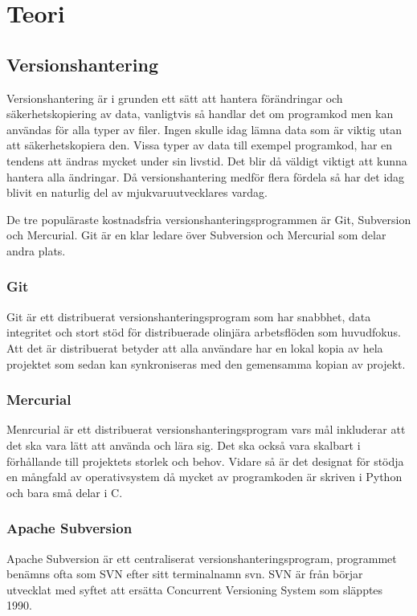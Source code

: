 \section{Teori}
\subsection{Versionshantering}
Versionshantering är i grunden ett sätt att hantera förändringar och säkerhetskopiering av data, vanligtvis så handlar det om programkod men kan användas för alla typer av filer. Ingen skulle idag lämna data som är viktig utan att säkerhetskopiera den. Vissa typer av data till exempel programkod, har en tendens att ändras mycket under sin livstid. Det blir då väldigt viktigt att kunna hantera alla ändringar. Då versionshantering medför flera fördela så har det idag blivit en naturlig del av mjukvaruutvecklares vardag.\cite{VersionControlGit}

De tre populäraste kostnadsfria versionshanteringsprogrammen är Git, Subversion och Mercurial. Git är en klar ledare över Subversion och Mercurial som delar andra plats.\cite{version_comp}
\subsubsection{Git}
Git är ett distribuerat versionshanteringsprogram som har snabbhet, data integritet och stort stöd för distribuerade olinjära arbetsflöden som huvudfokus. Att det är distribuerat betyder att alla användare har en lokal kopia av hela projektet som sedan kan synkroniseras med den gemensamma kopian av projekt.\cite{VersionControlGit}\cite{web_Git}

\subsubsection{Mercurial}
Menrcurial är ett distribuerat versionshanteringsprogram vars mål inkluderar att det ska vara lätt att använda och lära sig. Det ska också vara skalbart i förhållande till projektets storlek och behov. Vidare så är det designat för stödja en mångfald av operativsystem då mycket av programkoden är skriven i Python och bara små delar i C.
\cite{VersionControlMercurial}\cite{VersionControlMercurial}


\subsubsection{Apache Subversion}
Apache Subversion är ett centraliserat versionshanteringsprogram, programmet benämns ofta som SVN efter sitt terminalnamn svn. SVN är från börjar utvecklat med syftet att ersätta Concurrent Versioning System som släpptes 1990.\cite{wiki_cvs}\cite{VersionControlSvn}\cite{web_Svn}


